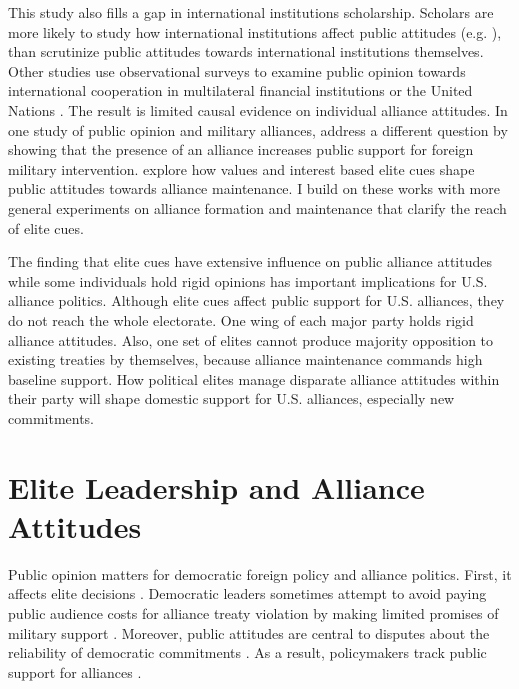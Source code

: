 \documentclass[12pt]{article}
\begin{document}
This study also fills a gap in international institutions scholarship. 
Scholars are more likely to study how international institutions affect public attitudes (e.g. \cite{Griecoetal2011, KayaWalker2014, Greenhill2020, RecchiaChu2021}), than scrutinize public attitudes towards international institutions themselves. 
Other studies use observational surveys to examine public opinion towards international cooperation in multilateral financial institutions \citep{Edwards2009} or the United Nations \citep{Torgler2008, DellmuthTallberg2015}. 
The result is limited causal evidence on individual alliance attitudes.
In one study of public opinion and military alliances, \citet{TomzWeeks2021} address a different question by showing that the presence of an alliance increases public support for foreign military intervention. 
\citet{Chuetal2021} explore how values and interest based elite cues shape public attitudes towards alliance maintenance. 
I build on these works with more general experiments on alliance formation and maintenance that clarify the reach of elite cues.


The finding that elite cues have extensive influence on public alliance attitudes while some individuals hold rigid opinions has important implications for U.S. alliance politics. 
Although elite cues affect public support for U.S. alliances, they do not reach the whole electorate.
One wing of each major party holds rigid alliance attitudes.
Also, one set of elites cannot produce majority opposition to existing treaties by themselves, because alliance maintenance commands high baseline support. 
How political elites manage disparate alliance attitudes within their party will shape domestic support for U.S. alliances, especially new commitments.



\section{Elite Leadership and Alliance Attitudes}


Public opinion matters for democratic foreign policy and alliance politics.
First, it affects elite decisions \citep{Tomzetal2020, LinGreenberg2021, ChuRechhia2021}. 
Democratic leaders sometimes attempt to avoid paying public audience costs for alliance treaty violation by making limited promises of military support \citep{Chibaetal2015, FjelstulReiter2019}. 
Moreover, public attitudes are central to disputes about the reliability of democratic commitments \citep{Gaubatz1996, GartzkeGleditsch2004}. 
As a result, policymakers track public support for alliances \citep{Sayle2019}. 
\end{document}
